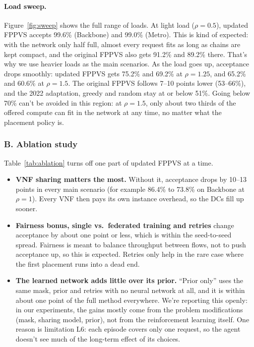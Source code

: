 \paragraph{Load sweep.} Figure~\ref{fig:sweep} shows the full range of loads. At
light load ($\rho=0.5$), updated FPPVS accepts 99.6\% (Backbone) and 99.0\%
(Metro). This is kind of expected: with the network only half full, almost
every request fits as long as chains are kept compact, and the original FPPVS
also gets 91.2\% and 89.2\% there. That's why we use heavier loads as the main
scenarios. As the load goes up, acceptance drops smoothly: updated FPPVS gets
75.2\% and 69.2\% at $\rho=1.25$, and 65.2\% and 60.6\% at $\rho=1.5$. The
original FPPVS follows 7--10 points lower (53--66\%), and the 2022 adaptation,
greedy and random stay at or below 51\%. Going below 70\% can't be avoided in
this region: at $\rho=1.5$, only about two thirds of the offered compute can fit
in the network at any time, no matter what the placement policy is.

\subsubsection*{B. Ablation study}

\begin{table}[H]
\centering\small
\caption{Ablation: hold-out acceptance (\%) of updated FPPVS with one part
switched off at a time.}
\label{tab:ablation}

\end{table}

Table~\ref{tab:ablation} turns off one part of updated FPPVS at a time.
\begin{itemize}
  \item \textbf{VNF sharing matters the most.} Without it, acceptance drops by
  10--13 points in every main scenario (for example 86.4\% to 73.8\% on Backbone
  at $\rho=1$). Every VNF then pays its own instance overhead, so the DCs fill up
  sooner.
  \item \textbf{Fairness bonus, single vs.\ federated training and retries}
  change acceptance by about one point or less, which is within the
  seed-to-seed spread. Fairness is meant to balance throughput between flows,
  not to push acceptance up, so this is expected. Retries only help in the rare
  case where the first placement runs into a dead end.
  \item \textbf{The learned network adds little over its prior.} ``Prior only''
  uses the same mask, prior and retries with no neural network at all, and it is
  within about one point of the full method everywhere. We're reporting this
  openly: in our experiments, the gains mostly come from the problem
  modifications (mask, sharing model, prior), not from the reinforcement
  learning itself. One reason is limitation L6: each episode covers only one
  request, so the agent doesn't see much of the long-term effect of its choices.
\end{itemize}

